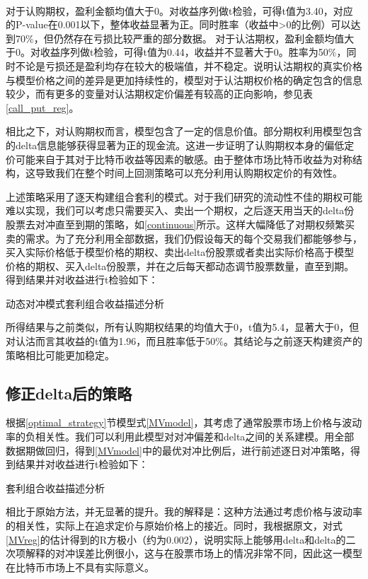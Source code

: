 ~\\
对于认购期权，盈利金额均值大于0。对收益序列做t检验，可得t值为3.40，对应的P-value在0.001以下，整体收益显著为正。同时胜率（收益中>0的比例）可以达到70$\%$，但仍然存在亏损比较严重的部分数据。
对于认沽期权，盈利金额均值大于0。对收益序列做t检验，可得t值为0.44，收益并不显著大于0。胜率为50$\%$，同时不论是亏损还是盈利均存在较大的极端值，并不稳定。说明认沽期权的真实价格与模型价格之间的差异是更加持续性的，模型对于认沽期权价格的确定包含的信息较少，而有更多的变量对认沽期权定价偏差有较高的正向影响，参见表\ref{call_put_reg}。
\par{相比之下，对认购期权而言，模型包含了一定的信息价值。部分期权利用模型包含的delta信息能够获得显著为正的现金流。这进一步证明了认购期权本身的偏低定价可能来自于其对于比特币收益等因素的敏感。由于整体市场比特币收益为对称结构，这导致我们在整个时间上回测策略可以充分利用认购期权定价的有效性。}
\par{上述策略采用了逐天构建组合套利的模式。对于我们研究的流动性不佳的期权可能难以实现，我们可以考虑只需要买入、卖出一个期权，之后逐天用当天的delta份股票去对冲直至到期的策略，如\ref{continuous}所示。这样大幅降低了对期权频繁买卖的需求。为了充分利用全部数据，我们仍假设每天的每个交易我们都能够参与，买入实际价格低于模型价格的期权、卖出delta份股票或者卖出实际价格高于模型价格的期权、买入delta份股票，并在之后每天都动态调节股票数量，直至到期。得到结果并对收益进行t检验如下：
}
\begin{table}[H]
    \caption{动态对冲模式套利组合收益描述分析}
    \centering
    


\end{table}
所得结果与之前类似，所有认购期权结果的均值大于0，t值为5.4，显著大于0，但对认沽而言其收益的t值为1.96，而且胜率低于50$\%$。其结论与之前逐天构建资产的策略相比可能更加稳定。
\subsection{修正delta后的策略}
根据\ref{optimal_strategy}节模型式\ref{MVmodel}，其考虑了通常股票市场上价格与波动率的负相关性。我们可以利用此模型对对冲偏差和delta之间的关系建模。用全部数据期做回归，得到\ref{MVmodel}中的最优对冲比例后，进行前述逐日对冲策略，得到结果并对收益进行t检验如下：
\begin{table}[H]
    \caption{套利组合收益描述分析}
    \centering
    
    
    
\end{table}
相比于原始方法，并无显著的提升。我的解释是：这种方法通过考虑价格与波动率的相关性，实际上在追求定价与原始价格上的接近。同时，我根据原文，对式\ref{MVreg}的估计得到的R方极小（约为0.002），说明实际上能够用delta和delta的二次项解释的对冲误差比例很小，这与在股票市场上的情况非常不同，因此这一模型在比特币市场上不具有实际意义。
